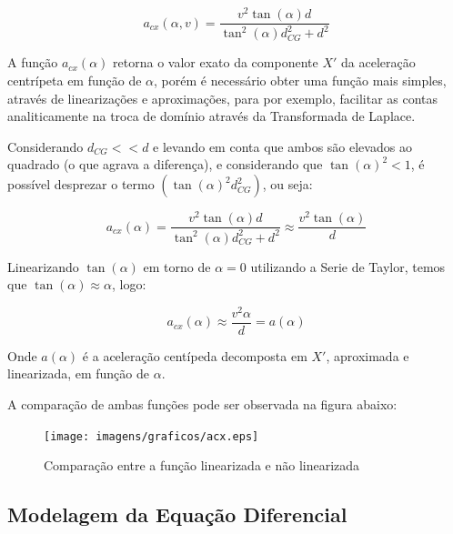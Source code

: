 \documentclass[conference,harvard,brazil,english]{sbatex}
\begin{document}
            \begin{equation}
                a_{cx}(\alpha, v) = \frac{v^2\tan(\alpha)d}{\tan^2(\alpha)d_{CG}^2+d^2}
            \end{equation}
            
            A função $a_{cx}(\alpha)$  retorna o valor exato da componente $X'$ da aceleração centrípeta em função de $\alpha$, porém é necessário obter uma função mais simples, através de linearizações e aproximações, para por exemplo, facilitar as contas analiticamente na troca de domínio através da Transformada de Laplace.
            
            Considerando $d_{CG} << d$ e levando em conta que ambos são elevados ao quadrado (o que agrava a diferença), e considerando que $\tan(\alpha)^2 < 1$, é possível desprezar o termo $(\tan(\alpha)^2d_{CG}^2)$, ou seja:
            
            \begin{equation}
                a_{cx} (\alpha) = \frac{v^2\tan(\alpha)d}{\tan^2(\alpha)d_{CG}^2+d^2} \approx \frac{v^2\tan(\alpha)}{d}
            \end{equation}
            
            Linearizando $\tan(\alpha)$ em torno de $\alpha = 0$ utilizando a Serie de Taylor, temos que $\tan(\alpha) \approx \alpha$, logo:
            
            \begin{equation}
                a_{cx} (\alpha) \approx \frac{v^2\alpha}{d} = a(\alpha)
            \end{equation}
            
            Onde $a(\alpha)$ é a aceleração centípeda decomposta em $X'$, aproximada e linearizada, em função de $\alpha$.
            
      		A comparação de ambas funções pode ser observada na figura abaixo:

			\begin{figure}[H]
                \hspace{-10mm} \texttt{[image: imagens/graficos/acx.eps]}
                \caption{Comparação entre a função linearizada e não linearizada}
            \end{figure}
            
        \subsection{Modelagem da Equação Diferencial}
\end{document}
